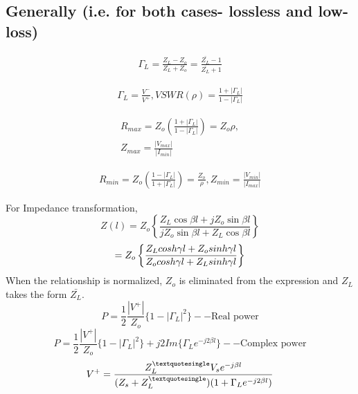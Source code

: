 \subsection*{Generally (i.e. for both cases- lossless and low-loss)}

\begin{align*}
\Gamma_L = \frac{Z_L - Z_o}{Z_L + Z_o} = \frac{\bar{Z_L} - 1}{\bar{Z_L} + 1}
\end{align*}

\begin{align*}
\Gamma_L = \frac{V^-}{V^+},
VSWR(\rho) = \frac{1 + |\Gamma_L|}{1 - |\Gamma_L|}
\end{align*}

\begin{align*}
R_{max} = Z_o \left( \frac{1 + |\Gamma_L|}{1 - |\Gamma_L|}\right) = Z_o \rho,\\
Z_{max} = \frac{|V_{max}|}{|I_{min}|}
\end{align*}

\begin{align*}
R_{min} = Z_o \left(\frac{1 - |\Gamma_L|}{1 + |\Gamma_L|}\right) = \frac{Z_o}{\rho}, Z_{min} = \frac{|V_{min}|}{|I_{max}|}
\end{align*}

For Impedance transformation, 
$$Z(l) = Z_o\left\{\frac{Z_L\cos\beta l + jZ_o\sin\beta l}{jZ_o\sin\beta l + Z_L\cos\beta l}\right\} $$
$$= Z_o\left\{\frac{Z_L\\cosh\gamma l + Z_o\\sinh\gamma l}{Z_o\\cosh\gamma l + Z_L\\sinh\gamma l}\right\}	$$
When the relationship is normalized, $Z_o$ is eliminated from the expression and $Z_L$ takes the form $\bar{Z_L}$.
$$P = \frac{1}{2}\frac{|V^+|}{Z_o}\lbrace 1 - |\Gamma_L|^2\rbrace --\text{Real power}	$$
$$P = \frac{1}{2}\frac{|V^+|}{Z_o}\lbrace 1 - |\Gamma_L|^2\rbrace + j2Im\lbrace \Gamma_L e^{- j2\beta l}\rbrace --\text{Complex power}$$
$$V^+ = \dfrac{Z_L^{\textquotesingle}V_s e^{-j\beta l}}{(Z_s + Z_L^{\textquotesingle})(1 + \Gamma_L e^{-j2\beta
l})}$$